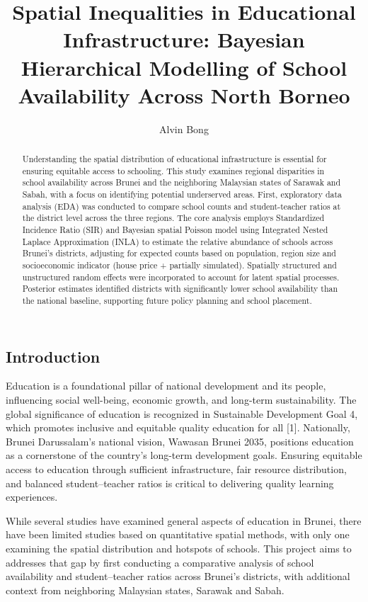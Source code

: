 \documentclass[
  letterpaper,
  DIV=11,
  numbers=noendperiod]{scrartcl}
\title{Spatial Inequalities in Educational Infrastructure: Bayesian
Hierarchical Modelling of School Availability Across North Borneo}
\author{Alvin Bong}
\date{}
\begin{document}
\maketitle
\begin{abstract}
Understanding the spatial distribution of educational infrastructure is
essential for ensuring equitable access to schooling. This study
examines regional disparities in school availability across Brunei and
the neighboring Malaysian states of Sarawak and Sabah, with a focus on
identifying potential underserved areas. First, exploratory data
analysis (EDA) was conducted to compare school counts and
student-teacher ratios at the district level across the three regions.
The core analysis employs Standardized Incidence Ratio (SIR) and
Bayesian spatial Poisson model using Integrated Nested Laplace
Approximation (INLA) to estimate the relative abundance of schools
across Brunei's districts, adjusting for expected counts based on
population, region size and socioeconomic indicator (house price +
partially simulated). Spatially structured and unstructured random
effects were incorporated to account for latent spatial processes.
Posterior estimates identified districts with significantly lower school
availability than the national baseline, supporting future policy
planning and school placement.
\end{abstract}


\subsection{Introduction}\label{introduction}

Education is a foundational pillar of national development and its
people, influencing social well-being, economic growth, and long-term
sustainability. The global significance of education is recognized in
Sustainable Development Goal 4, which promotes inclusive and equitable
quality education for all {[}1{]}. Nationally, Brunei Darussalam's
national vision, Wawasan Brunei 2035, positions education as a
cornerstone of the country's long-term development goals. Ensuring
equitable access to education through sufficient infrastructure, fair
resource distribution, and balanced student--teacher ratios is critical
to delivering quality learning experiences.

While several studies have examined general aspects of education in
Brunei, there have been limited studies based on quantitative spatial
methods, with only one examining the spatial distribution and hotspots
of schools. This project aims to addresses that gap by first conducting
a comparative analysis of school availability and student--teacher
ratios across Brunei's districts, with additional context from
neighboring Malaysian states, Sarawak and Sabah.
\end{document}
